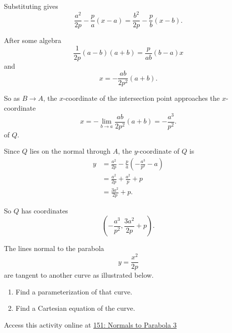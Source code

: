 \documentclass{ximera}
\begin{document}
\begin{question}
\begin{explanation}
Substituting gives
\[ 
           \frac{a^2}{2p} - \frac{p}{a}\left( x-a \right) = \frac{b^2}{2p} - \frac{p}{b}\left( x-b \right) .
\]

After some algebra
\[
   \frac{1}{2p} \left(a-b\right)\left( a+b \right) = \frac{p}{ab}\left(b-a  \right)x 
\]
and
\[
    x =- \frac{ab}{2p^2} \left(a+b \right).
\]

So as $B\to A$, the $x$-coordinate of the intersection point approaches the $x$-coordinate
\[
 x = - \lim_{b\to a} \frac{ab}{2p^2} \left(a+b \right) = -\frac{a^3}{p^2} .
\]
of $Q$. 

Since $Q$ lies on the normal through $A$, the $y$-coordinate of $Q$ is
\begin{align*}
  y &= \frac{a^2}{2p} - \frac{p}{a}\left( -\frac{a^3}{p^2}-a \right) \\
          &= \frac{a^2}{2p} + \frac{a^2}{p} + p \\
          &= \frac{3a^2}{2p} + p .
\end{align*}

So $Q$ has coordinates
\[
      \left(   -\frac{a^3}{p^2}, \frac{3a^2}{2p} + p \right) .
\]

\end{explanation}
\end{question}

\begin{question} \label{Qoefrr3}

The lines normal to the parabola 
\[
  y = \frac{x^2}{2p}
\]
are tangent to another curve as illustrated below.

\begin{enumerate}
\item Find a parameterization of that curve.

\item Find a Cartesian equation of the curve.
\end{enumerate}


\begin{onlineOnly}
    \begin{center}
\end{center}
\end{onlineOnly}

Access this activity online at \href{https://www.desmos.com/calculator/xjly7skb9p}{151: Normals to Parabola 3}

\end{question}
\end{document}
